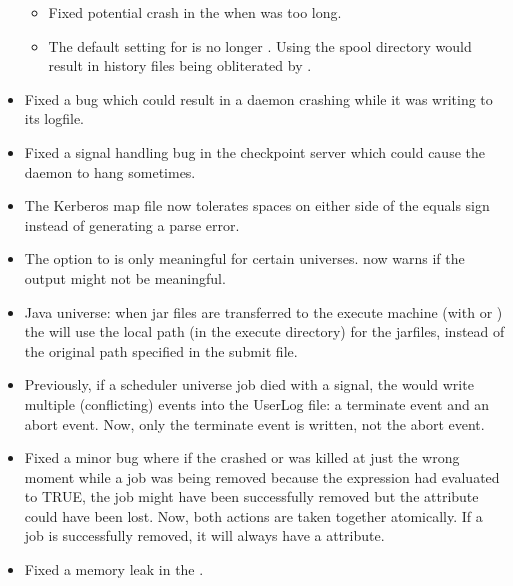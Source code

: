 \begin{itemize}
\begin{itemize}
  \item Fixed potential crash in the  when
     was too long.

  \item The default setting for  is no
    longer .
    Using the spool directory would result in history files being
    obliterated by .

\end{itemize}

\item Fixed a bug which could result in a daemon crashing while it was
	writing to its logfile.

\item Fixed a signal handling bug in the checkpoint server which could
  cause the daemon to hang sometimes.

\item The Kerberos map file now tolerates spaces on either side of the
	equals sign instead of generating a parse error.

\item The  option to  is only meaningful for certain
  universes.   now warns if the output might not be meaningful. 

\item Java universe: when jar files are transferred to the execute
  machine (with  or
  ) the  will use the
  local path (in the execute directory) for the jarfiles, instead of
  the original path specified in the submit file.

\item Previously, if a scheduler universe job died with a signal, the
   would write multiple (conflicting) events into the
  UserLog file: a terminate event and an abort event.
  Now, only the terminate event is written, not the abort event.

\item Fixed a minor bug where if the  crashed or was
  killed at just the wrong moment while a job was being removed
  because the  expression had evaluated to
  TRUE, the job might have been successfully removed but the
   attribute could have been lost.
  Now, both actions are taken together atomically.
  If a job is successfully removed, it will always have a
   attribute.

\item Fixed a memory leak in the .

\end{itemize}

